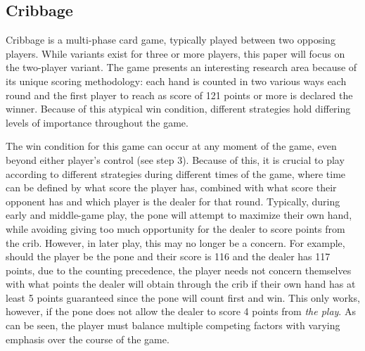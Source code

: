 

\subsection{Cribbage}

Cribbage is a multi-phase card game, typically played between two opposing
players.
%
While variants exist for three or more players, this paper will focus on the
two-player variant.
%
The game presents an interesting research area because of its unique scoring
methodology:
each hand is counted in two various ways each round and the first player to
reach as score of 121 points or more is declared the winner.
%
Because of this atypical win condition, different strategies hold differing
levels of importance throughout the game.




The win condition for this game can occur at any moment of the game,
even beyond either player's control (see step 3).
%
Because of this,
it is crucial to play according to different strategies during
different times of the game,
where time can be defined by what score the player has,
combined with what score their opponent has
and which player is the dealer for that round.
%
Typically, during early and middle-game play,
the pone will attempt to maximize their own hand,
while avoiding giving too much opportunity for the dealer to score points from
the crib.
%
However, in later play, this may no longer be a concern.
%
For example, should the player be the pone and their score is 116
and the dealer has 117 points,
due to the counting precedence,
the player needs not concern themselves with what points the dealer will obtain
through the crib if their own hand has at least 5 points guaranteed
since the pone will count first and win.
%
This only works, however, if the pone does not allow the dealer to score 4
points from \textit{the play}.
%
As can be seen, the player must balance multiple competing factors with varying
emphasis over the course of the game.

